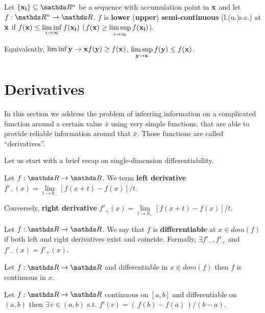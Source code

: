 \documentclass[computationalMathematics.tex]{subfiles}
\begin{document}
\begin{definition}
	Let $\{\vect{x_i}\}\subseteq \R^n$ be a sequence with accumulation point in ${\bf x }$ and let $f: \R^n \to \R$.
	$f$ is \textbf{lower} (\textbf{upper}) \textbf{semi-continuous} (l.(u.)s.c.) at ${\bf x }$ if $f({\bf x }) \leq \liminf\limits_{i \to \infty} f({\bf x_i })$ ($f({\bf x }) \geq \limsup\limits_{i \to \infty} f({\bf x_i })$).

	Equivalently, $\liminf\limits{{\bf y } \to {\bf x }} f({\bf y }) \geq f({\bf x })$, $\limsup\limits_{{\bf y } \to {\bf x }} f({\bf y }) \leq f({\bf x })$.\\
\end{definition}

\section{Derivatives}

In this section we address the problem of inferring information on a complicated function around a certain value $\bar{x}$ using very simple functions, that are able to provide reliable information  around that $\bar{x}$.
Those functions are called ``derivatives''.

\noindent Let us start with a brief recap on single-dimension differentiability.

\begin{definition}
  Let $f: \R \to \R$. We term \textbf{left derivative} $f'_{-}(x) = \lim\limits_{t \to 0_{-}} [f(x + t) - f(x)] / t$.
  
  Conversely, \textbf{right derivative} $f'_{+}(x) = \lim\limits_{t \to 0_{+}} [f(x + t) - f(x)] / t$.
\end{definition}

\begin{definition}[Differentiable]
  Let $f:\R \to \R$. We say that $f$ is \textbf{differentiable} at $x \in dom(f)$ if both left and right derivatives exist and coincide.
  Formally, $\exists f'_-, f'_+$ and $f'_-(x) = f'_+(x)$.
\end{definition}

\begin{proposition}
  Let $f: \R \to \R$ and differentiable in $x \in dom(f)$ then $f$ is continuous in $x$. 
\end{proposition}


\begin{theorem}
Let $f : \R \to \R$ continuous on $[a, b]$ and differentiable on $(a,b)$ then $\exists \, c \in (a, b)$ s.t. $f'(c) = ( \, f(b) - f(a) \, ) / (b - a)$.
\end{theorem}
\end{document}
